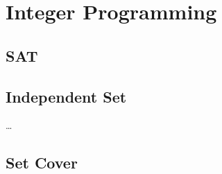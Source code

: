 \chapter{Integer Programming}

\section{SAT}

\section{Independent Set}

\begin{definition}
  \label{def:well_covered}
  \ldots{}
\end{definition}

\section{Set Cover}
% 


